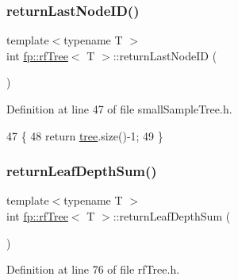\subsubsection{\texorpdfstring{return\+Last\+Node\+I\+D()}{returnLastNodeID()}\hspace{0.1cm}{\footnotesize\ttfamily [2/2]}}
{\footnotesize\ttfamily template$<$typename T $>$ \\
int \hyperlink{classfp_1_1rfTree}{fp\+::rf\+Tree}$<$ T $>$\+::return\+Last\+Node\+ID (\begin{DoxyParamCaption}{ }\end{DoxyParamCaption})\hspace{0.3cm}{\ttfamily [inline]}}



Definition at line 47 of file small\+Sample\+Tree.\+h.


\begin{DoxyCode}
47                                              \{
48                     \textcolor{keywordflow}{return} \hyperlink{classfp_1_1rfTree_a1d5c209715f4044a85878c17e2b3ee53}{tree}.size()-1;
49                 \}
\end{DoxyCode}
\mbox{\label{classfp_1_1rfTree_a7e0126c03547b4e6ed25b1c452255bbe}} 
\subsubsection{\texorpdfstring{return\+Leaf\+Depth\+Sum()}{returnLeafDepthSum()}\hspace{0.1cm}{\footnotesize\ttfamily [1/2]}}
{\footnotesize\ttfamily template$<$typename T $>$ \\
int \hyperlink{classfp_1_1rfTree}{fp\+::rf\+Tree}$<$ T $>$\+::return\+Leaf\+Depth\+Sum (\begin{DoxyParamCaption}{ }\end{DoxyParamCaption})\hspace{0.3cm}{\ttfamily [inline]}}



Definition at line 76 of file rf\+Tree.\+h.


